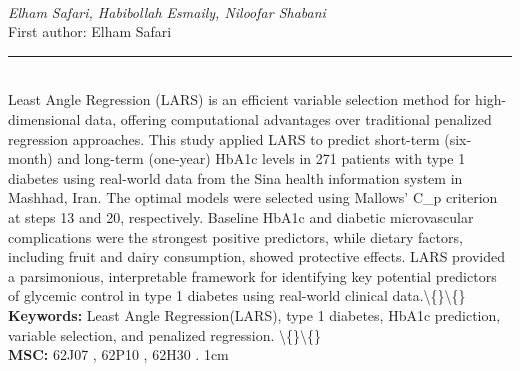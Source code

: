 \documentclass[10pt,twoside]{article}
\begin{document}
\noindent\begin{minipage}[t][\textheight]{\textwidth}
\\[0.35em]
{\itshape Elham Safari, Habibollah Esmaily, Niloofar Shabani}\\[0.2em]
{\footnotesize First author: Elham Safari}\\[0.45em]
\noindent\rule{\textwidth}{0.3pt}\\[0.4em]
{\footnotesize  Least Angle Regression (LARS) is an efficient variable selection method for high-dimensional data, offering computational advantages over traditional penalized regression approaches. This study applied LARS to predict short-term (six-month) and long-term (one-year) HbA1c levels in 271 patients with type 1 diabetes using real-world data from the Sina health information system in Mashhad, Iran. The optimal models were selected using Mallows' C\_p criterion at steps 13 and 20, respectively. Baseline HbA1c and diabetic microvascular complications were the strongest positive predictors, while dietary factors, including fruit and dairy consumption, showed protective effects. LARS provided a parsimonious, interpretable framework for identifying key potential predictors of glycemic control in type 1 diabetes using real-world clinical data.\textbackslash\{\}\textbackslash\{\}}\\[0.4em]
{\footnotesize\bfseries Keywords:} {\footnotesize Least Angle Regression(LARS), type 1 diabetes, HbA1c prediction, variable selection, and penalized regression. \textbackslash\{\}\textbackslash\{\}}\\[0.15em]
{\footnotesize\bfseries MSC:} {\footnotesize 62J07 , 62P10 , 62H30 . 1cm}\\
\vfill
\end{minipage}
\newpage
\end{document}
